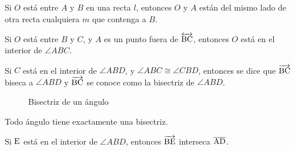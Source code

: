 \begin{theorem}
    Si $O$ está entre $A$ y $B$ en una recta $l$, entonces $O$ y $A$ están del mismo lado de otra recta cualquiera $m$ que contenga a $B$.
\end{theorem}

\begin{theorem}
    Si $O$ está entre $B$ y $C$, y $A$ es un punto fuera de $\overleftrightarrow{\rm BC}$, entonces $O$ está en el interior de $\angle{ABC}$.
\end{theorem}

\begin{definition}
    Si $C$ está en el interior de $\angle{ABD}$, y $\angle{ABC} \cong \angle{CBD}$, entonces se dice que $\overrightarrow{\rm BC}$ biseca a $\angle{ABD}$ y $\overrightarrow{\rm BC}$ se conoce como la bisectriz de $\angle{ABD}$. 

    \begin{figure}[!h]
        \centering
        
        \caption{Bisectriz de un ángulo}
        \label{fig:ang-bizectriz}
    \end{figure}
    
\end{definition}

\begin{theorem}
    Todo ángulo tiene exactamente una bisectriz.
\end{theorem}

\begin{theorem}
    Si $\rm E$ está en el interior de $\angle{ABD}$, entonces $\overrightarrow{\rm BE}$ interseca $\overline{\rm AD}$.
\end{theorem}

\nocite{MGECED05}
\printbibliography[heading=subbibliography,title={Bibliografía}]